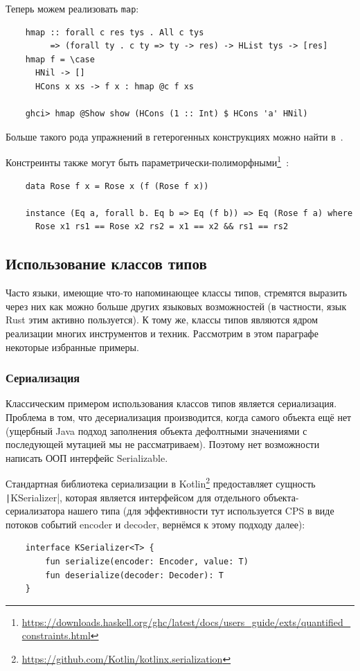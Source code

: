 Теперь можем реализовать \texttt{map}:
\begin{verbatim}
    hmap :: forall c res tys . All c tys
         => (forall ty . c ty => ty -> res) -> HList tys -> [res]
    hmap f = \case
      HNil -> []
      HCons x xs -> f x : hmap @c f xs

    ghci> hmap @Show show (HCons (1 :: Int) $ HCons 'a' HNil)
\end{verbatim}

Больше такого рода упражнений в гетерогенных конструкциях можно найти в~\cite{de2014true}.

Констреинты также могут быть параметрически-полиморфными\footnote{\url{https://downloads.haskell.org/ghc/latest/docs/users_guide/exts/quantified_constraints.html}}~\cite{bottu2017quantified}:
\begin{verbatim}
    data Rose f x = Rose x (f (Rose f x))

    instance (Eq a, forall b. Eq b => Eq (f b)) => Eq (Rose f a) where
      Rose x1 rs1 == Rose x2 rs2 = x1 == x2 && rs1 == rs2
\end{verbatim}

\subsection{Использование классов типов}

Часто языки, имеющие что-то напоминающее классы типов, стремятся выразить через них как можно больше других языковых возможностей (в частности, язык Rust этим активно пользуется).
К тому же, классы типов являются ядром реализации многих инструментов и техник.
Рассмотрим в этом параграфе некоторые избранные примеры.

\subsubsection{Сериализация}

Классическим примером использования классов типов является сериализация.
Проблема в том, что десериализация производится, когда самого объекта ещё нет (ущербный Java подход заполнения объекта дефолтными значениями с последующей мутацией мы не рассматриваем).
Поэтому нет возможности написать ООП интерфейс Serializable.

Стандартная библиотека сериализации в Kotlin\footnote{\url{https://github.com/Kotlin/kotlinx.serialization}} предоставляет сущность \texttt|KSerializer|, которая является интерфейсом для отдельного объекта-сериализатора нашего типа (для эффективности тут используется CPS в виде потоков событий encoder и decoder, вернёмся к этому подходу далее):
\begin{verbatim}
    interface KSerializer<T> {
        fun serialize(encoder: Encoder, value: T)
        fun deserialize(decoder: Decoder): T
    }
\end{verbatim}

